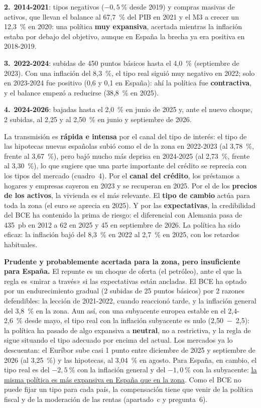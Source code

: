 \begin{examen}
\textbf{2.}~\textbf{2014-2021}: tipos negativos ($-0{,}5~\%$ desde 2019) y compras masivas de activos, que llevan el balance al 67,7~\% del PIB en 2021 y el M3 a crecer un 12,3~\% en 2020: una política \textbf{muy expansiva}, acertada mientras la inflación estaba por debajo del objetivo, aunque en España la brecha ya era positiva en 2018-2019.


\textbf{3.}~\textbf{2022-2024}: subidas de 450 puntos básicos hasta el 4,0~\% (septiembre de 2023). Con una inflación del 8,3~\%, el tipo real siguió muy negativo en 2022; solo en 2023-2024 fue positivo (0,6 y 0,1 en España): ahí la política fue \textbf{contractiva}, y el balance empezó a reducirse (38,8~\% en 2025).


\textbf{4.}~\textbf{2024-2026}: bajadas hasta el 2,0~\% en junio de 2025 y, ante el nuevo choque, 2 subidas, al 2,25 y al 2,50~\% en junio y septiembre de 2026.

La transmisión es \textbf{rápida e intensa} por el canal del tipo de interés: el tipo de las hipotecas nuevas españolas subió como el de la zona en 2022-2023 (al 3,78~\%, frente al 3,67~\%), pero bajó mucho más deprisa en 2024-2025 (al 2,73~\%, frente al 3,30~\%), lo que sugiere que una parte importante del crédito se reprecia con los tipos del mercado (cuadro~4). Por el \textbf{canal del crédito}, los préstamos a hogares y empresas cayeron en 2023 y se recuperan en 2025. Por el de los \textbf{precios de los activos}, la vivienda es el más relevante. El \textbf{tipo de cambio} actúa para toda la zona (el euro se aprecia en 2025). Y por las \textbf{expectativas}, la credibilidad del BCE ha contenido la prima de riesgo: el diferencial con Alemania pasa de 435~pb en 2012 a 62 en 2025 y 45 en septiembre de 2026. La política ha sido eficaz: la inflación bajó del 8,3~\% en 2022 al 2,7~\% en 2025, con los retardos habituales.

\textbf{Prudente y probablemente acertada para la zona, pero insuficiente para España.} El repunte es un choque de oferta (el petróleo), ante el que la regla es «mirar a través» si las expectativas están ancladas. El BCE ha optado por un endurecimiento gradual (2 subidas de 25 puntos básicos) por 2 razones defendibles: la lección de 2021-2022, cuando reaccionó tarde, y la inflación general del 3,8~\% en la zona. Aun así, con una subyacente europea estable en el 2,4-2,6~\% desde mayo, el tipo real con la inflación subyacente es nulo (2,50~$-$~2,5): la política ha pasado de algo expansiva a \textbf{neutral}, no a restrictiva, y la regla de  sigue situando el tipo adecuado por encima del actual. Los mercados ya lo descuentan: el Euríbor sube casi 1 punto entre diciembre de 2025 y septiembre de 2026 (al 3,25~\%) y las hipotecas, al 3,04~\% en agosto. Para España, en cambio, el tipo real es del $-2{,}5~\%$ con la inflación general y del $-1{,}0~\%$ con la subyacente: \uline{la misma política es más expansiva en España que en la zona}. Como el BCE no puede fijar un tipo para cada país, la compensación tiene que venir de la política fiscal y de la moderación de las rentas (apartado~c y pregunta~6).

\end{examen}

